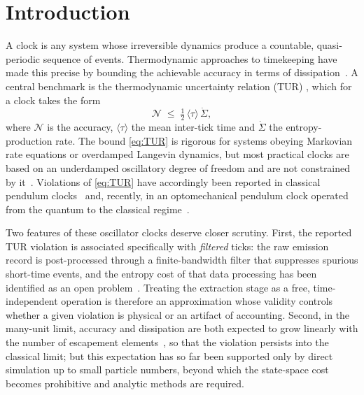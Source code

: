 \documentclass[aps,pre,reprint,amsmath,amssymb,floatfix,nofootinbib]{revtex4-2}
\newcommand{\avg}[1]{\langle #1 \rangle}
\newcommand{\Sdot}{\dot{\Sigma}}
\begin{document}
\maketitle

\section{Introduction}

A clock is any system whose irreversible dynamics produce a countable,
quasi-periodic sequence of events. Thermodynamic approaches to
timekeeping have made this precise by bounding the achievable accuracy in
terms of dissipation~\cite{BaratoSeifert2016,Erker2017,Milburn2020,Pearson2021,Meier2023,Prech2025}.
A central benchmark is the thermodynamic uncertainty relation (TUR)
\cite{BaratoSeifert2015,Gingrich2016,HorowitzGingrich2020}, which for a
clock takes the form
\begin{equation}
  \mathcal{N} \;\le\; \tfrac{1}{2}\,\avg{\tau}\,\Sdot ,
  \label{eq:TUR}
\end{equation}
where $\mathcal{N}$ is the accuracy, $\avg{\tau}$ the mean inter-tick
time and $\Sdot$ the entropy-production rate. The bound
\eqref{eq:TUR} is rigorous for systems obeying Markovian rate equations
or overdamped Langevin dynamics, but most practical clocks are based on
an underdamped oscillatory degree of freedom and are not constrained by
it~\cite{Pietzonka2022,Gopal2024,Culhane2024,Scheer2024,Brunelli2026}.
Violations of \eqref{eq:TUR} have accordingly been reported in classical
pendulum clocks~\cite{Pietzonka2022,Gopal2024} and, recently, in an
optomechanical pendulum clock operated from the quantum to the classical
regime~\cite{Brunelli2026}.

Two features of these oscillator clocks deserve closer scrutiny. First,
the reported TUR violation is associated specifically with
\emph{filtered} ticks: the raw emission record is post-processed through a
finite-bandwidth filter that suppresses spurious short-time events, and
the entropy cost of that data processing has been identified as an open
problem~\cite{Brunelli2026,Wadhia2025}. Treating the extraction stage as
a free, time-independent operation is therefore an approximation whose
validity controls whether a given violation is physical or an artifact of
accounting. Second, in the many-unit limit, accuracy and dissipation are
both expected to grow linearly with the number of escapement
elements~\cite{Brunelli2026}, so that the violation persists into the
classical limit; but this expectation has so far been supported only by
direct simulation up to small particle numbers, beyond which the
state-space cost becomes prohibitive and analytic methods are required.
\end{document}
